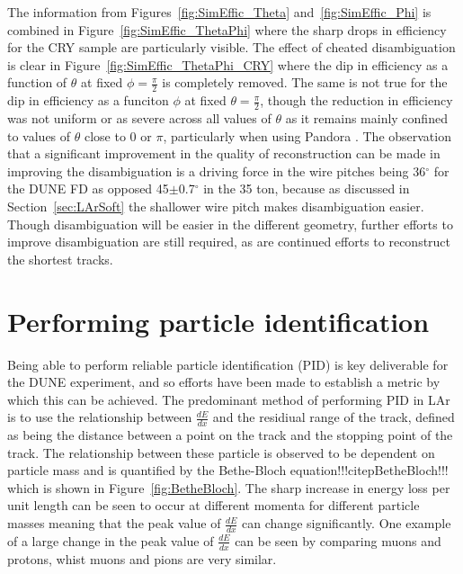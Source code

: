 The information from Figures~\ref{fig:SimEffic_Theta} and~\ref{fig:SimEffic_Phi} is combined in Figure~\ref{fig:SimEffic_ThetaPhi} where the sharp drops in efficiency for the CRY sample are particularly visible. The effect of cheated disambiguation is clear in Figure~\ref{fig:SimEffic_ThetaPhi_CRY} where the dip in efficiency as a function of $\theta$ at fixed $\phi=\frac{\pi}{2}$ is completely removed. The same is not true for the dip in efficiency as a funciton $\phi$ at fixed $\theta = \frac{\pi}{2}$, though the reduction in efficiency was not uniform or as severe across all values of $\theta$ as it remains mainly confined to values of $\theta$ close to 0 or $\pi$, particularly when using Pandora . The observation that a significant improvement in the quality of reconstruction can be made in improving the disambiguation is a driving force in the wire pitches being 36$^{\circ}$ for the DUNE FD as opposed 45$\pm$0.7$^{\circ}$ in the 35 ton, because as discussed in Section~\ref{sec:LArSoft} the shallower wire pitch makes disambiguation easier. Though disambiguation will be easier in the different geometry, further efforts to improve disambiguation are still required, as are continued efforts to reconstruct the shortest tracks. \\

\section{Performing particle identification}  %
Being able to perform reliable particle identification (PID) is key deliverable for the DUNE experiment, and so efforts have been made to establish a metric by which this can be achieved. The predominant method of performing PID in LAr is to use the relationship between $\frac{dE}{dx}$ and the residiual range of the track, defined as being the distance between a point on the track and the stopping point of the track. The relationship between these particle is observed to be dependent on particle mass and is quantified by the Bethe-Bloch equation!!!citep{BetheBloch}!!! which is shown in Figure~\ref{fig:BetheBloch}. The sharp increase in energy loss per unit length can be seen to occur at different momenta for different particle masses meaning that the peak value of $\frac{dE}{dx}$ can change significantly. One example of a large change in the peak value of $\frac{dE}{dx}$ can be seen by comparing muons and protons, whist muons and pions are very similar. \\


